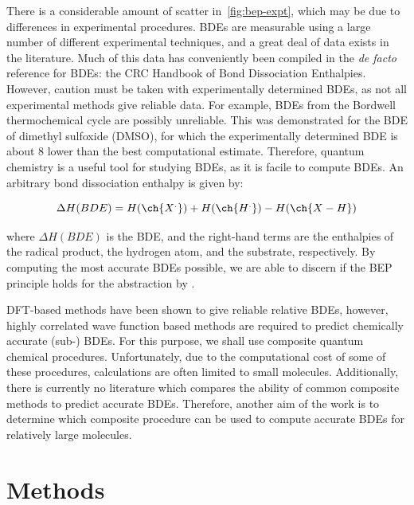 There is a considerable amount of scatter in~\ref{fig:bep-expt}, which may be due to differences in experimental procedures. BDEs are measurable using a large number of different experimental techniques, and a great deal of data exists in the literature. Much of this data has conveniently been compiled in the \emph{de facto} reference for BDEs: the CRC Handbook of Bond Dissociation Enthalpies.\cite{Luo2002} However, caution must be taken with experimentally determined BDEs, as not all experimental methods give reliable data. For example, BDEs from the Bordwell\cite{Bordwell1988} thermochemical cycle are possibly unreliable.\cite{Salamone2012, Miller2016} This was demonstrated for the BDE of dimethyl sulfoxide (DMSO), for which the experimentally determined BDE is about 8 \kcalmol lower than the best computational estimate.\cite{Salamone2012} Therefore, quantum chemistry is a useful tool for studying BDEs, as it is facile to compute BDEs. An arbitrary  bond dissociation enthalpy is given by:

\begin{equation}
  \Delta H(BDE) =  H(\ch{X^.}) + H(\ch{H^.}) - H(\ch{X-H})
\end{equation}

\noindent where $\Delta H(BDE)$ is the BDE, and the right-hand terms are the enthalpies of the radical product, the hydrogen atom, and the substrate, respectively. By computing the most accurate BDEs possible, we are able to discern if the BEP principle holds for the  abstraction by \cumo.

DFT-based methods have been shown to give reliable relative BDEs, however, highly correlated wave function based methods are required to predict chemically accurate (sub-\kcalmol) BDEs.\cite{DiLabio1999, Chan2012, Wiberg2014} For this purpose, we shall use composite quantum chemical procedures. Unfortunately, due to the computational cost of some of these procedures, calculations are often limited to small molecules. Additionally, there is currently no literature which compares the ability of common composite methods to predict accurate BDEs. Therefore, another aim of the work is to determine which composite procedure can be used to compute accurate BDEs for relatively large molecules.

\section{Methods}


